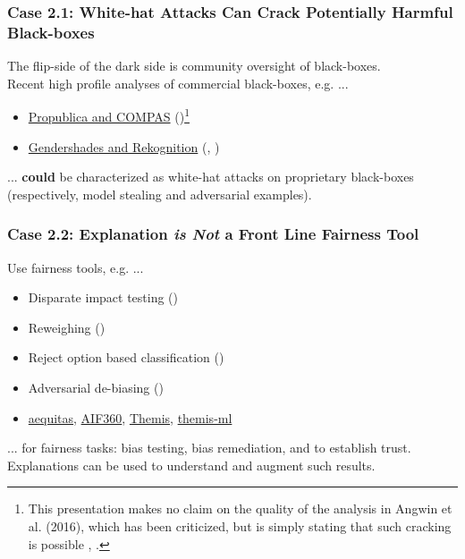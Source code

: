 \documentclass[11pt,aspectratio=169,hyperref={colorlinks}]{beamer}
\begin{document}
	\begin{frame}
	
		\frametitle{\large{\textbf{Case 2.1}: White-hat Attacks Can Crack Potentially Harmful Black-boxes}}
		\large
		The flip-side of the dark side is community oversight of black-boxes.\\
		\vspace{10pt}
		Recent high profile analyses of commercial black-boxes, e.g. ... 
		\begin{itemize}		
			\item \href{https://www.propublica.org/article/machine-bias-risk-assessments-in-criminal-sentencing}{Propublica and COMPAS} (\citet{angwin16})\footnote{\tiny{This presentation makes no claim on the quality of the analysis in Angwin et al. (2016), which has been criticized, but is simply stating that such cracking is possible \cite{angwin16,}, \cite{flores2016false}}.}
			\item \href{https://medium.com/@Joy.Buolamwini/response-racial-and-gender-bias-in-amazon-rekognition-commercial-ai-system-for-analyzing-faces-a289222eeced}{Gendershades and Rekognition} (\citet{gender_shades}, \citet{raji2019actionable})
		\end{itemize}
		... \textbf{could} be characterized as white-hat attacks on proprietary black-boxes (respectively, model stealing and adversarial examples).

	\end{frame}
	
	\begin{frame}[label={not_frontline}]
	
		\frametitle{\textbf{Case 2.2}: Explanation \textbf{\textit{is Not}} a Front Line Fairness Tool}
		\large
		Use fairness tools, e.g. ...
		\vspace{5pt}
		\begin{itemize}\normalsize
			\item Disparate impact testing (\citet{feldman2015certifying})
			\item Reweighing (\citet{kamiran2012data})
			\item Reject option based classification (\citet{kamiran2012decision})
			\item Adversarial de-biasing (\citet{zhang2018mitigating})
			\item \href{https://github.com/dssg/aequitas}{aequitas}, \href{https://github.com/IBM/AIF360}{AIF360}, \href{https://github.com/LASER-UMASS/Themis}{Themis}, \href{https://github.com/cosmicBboy/themis-ml}{themis-ml}
		\end{itemize}
		\vspace{5pt}
		... for fairness tasks: bias testing, bias remediation, and to establish trust.\\
		\vspace{10pt}
		Explanations can be used to understand and augment such results.
		
	\end{frame}
	
\end{document}
